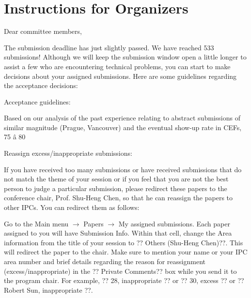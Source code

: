 \documentclass[12pt]{article}
\begin{document}
\appendix

\section{Instructions for Organizers}
\label{sec:instr-organ}

Dear committee members, 

The submission deadline has just slightly passed.  We have reached 533 submissions!  Although we will keep the submission window open a little longer to assist a few who are encountering technical problems, you can start to make decisions about your assigned submissions. Here are some guidelines regarding the acceptance decisions:

Acceptance guidelines:

Based on our analysis of the past experience relating to abstract submissions of similar magnitude (Prague, Vancouver) and the eventual show-up rate in CEFs, 75 â 80%

Reassign excess/inappropriate submissions: 

If you have received too many submissions or have received submissions that do not match the theme of your session or if you feel that you are not the best person to judge a particular submission, please redirect these papers to the conference chair, Prof. Shu-Heng Chen, so that he can reassign the papers to other IPCs. You can redirect them as follows:

Go to the Main menu $\rightarrow$  Papers $\rightarrow$ My assigned submissions. Each paper assigned to you will have Submission Info. 
Within that cell, change the Area information from the title of your session to ?? Others (Shu-Heng Chen)??. This will redirect the paper to the chair.  
Make sure to mention your name or your IPC area number and brief details regarding the reason for reassignment (excess/inappropriate) in the ?? Private Comments?? box while you send it to the program chair. For example,  ?? 28, inappropriate ?? or ?? 30, excess ?? or  ??Robert Sun, inappropriate ??. 
\end{document}
